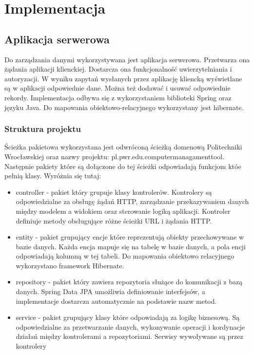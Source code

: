 \chapter{Implementacja}

\section{Aplikacja serwerowa}
Do zarządzania danymi wykorzystywana jest aplikacja serwerowa. Przetwarza ona żądania aplikacji klienckiej. Dostarcza ona funkcjonalność uwierzytelniania i autoryzacji. W wyniku zapytań wysłanych przez aplikację kliencką wyświetlane są w aplikacji odpowiednie dane. Można też dodawać i usuwać odpowiednie rekordy. Implementacja odbywa się z wykorzystaniem biblioteki Spring oraz języku Java. Do mapowania obiektowo-relacyjnego wykorzystany jest hibernate.

\subsection{Struktura projektu}
Ścieżka pakietowa wykorzystana jest odwróconą ścieżką domenową Politechniki Wrocławskiej oraz nazwy projektu: pl.pwr.edu.computermanagamenttool. Następnie pakiety które są dołączone do tej ścieżki odpowiadają funkcjom któe pełnią klasy. Wyróżnia się tutaj:

\begin{itemize}[label=•]
\item controller - pakiet który grupuje klasy kontrolerów. Kontrolery są odpowiedzialne za obsługę żądań HTTP, zarządzanie przekazywaniem danych między modelem a widokiem oraz sterowanie logiką aplikacji. Kontroler definiuje metody obsługujące różne ścieżki URL i żądania HTTP.
\item entity - pakiet grupujący encje które reprezentują obiekty przechowywane w bazie danych. Każda encja mapuje się na tabelę w bazie danych, a pola encji odpowiadają kolumną w tej tabeli. Do mapowania obiektowo relacyjnego wykorzystano framework Hibernate.
\item repository - pakiet który zawiera repozytoria służące do komunikacji z bazą danych. Spring Data JPA umożliwia definiowanie interfejsów, a implementacje dostarcza automatycznie na podstawie nazw metod.
\item service - pakiet grupujący klasy które odpowiadają za logikę biznesową. Są odpowiedzialne za przetwarzanie danych, wykonywanie operacji i kordynacje działań między kontrolerami a repozytoriami. Serwisy wywoływane są przez kontrolery
\end{itemize}


